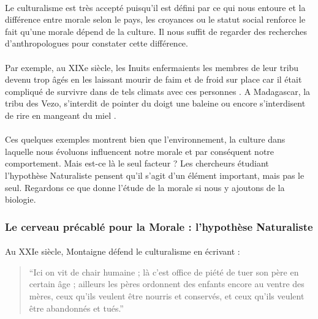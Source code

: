 \documentclass[10pt, french, a4paper]{report}
\begin{document}
\paragraph{}
Le culturalisme est très accepté puisqu'il est défini par ce qui nous entoure et la différence entre morale selon le pays, les croyances ou le statut social renforce le fait qu'une morale dépend de la culture. Il nous suffit de regarder des recherches d'anthropologues pour constater cette différence.

\paragraph{}
Par exemple, au XIXe siècle, les Inuits enfermaients les membres de leur tribu devenu trop âgés en les laissant mourir de faim et de froid sur place car il était compliqué de survivre dans de tels climats avec ces personnes \citep{redfield_primitive_1965}. A Madagascar, la tribu des Vezo, s'interdit de pointer du doigt une baleine ou encore s'interdisent de rire en mangeant du miel \citep{astuti_moralite_2007}.

\paragraph{}
Ces quelques exemples montrent bien que l'environnement, la culture dans laquelle nous évoluons influencent notre morale et par conséquent notre comportement. Mais est-ce là le seul facteur ? Les chercheurs étudiant l'hypothèse Naturaliste pensent qu'il s'agit d'un élément important, mais pas le seul. Regardons ce que donne l'étude de la morale si nous y ajoutons de la biologie.


\subsubsection{Le cerveau précablé pour la Morale : l'hypothèse Naturaliste}

\paragraph{}
Au XXIe siècle, Montaigne défend le culturalisme en écrivant : 

\begin{quotation}
  ``Ici on vit de chair humaine ; là c'est office de piété de tuer son père en certain âge ; ailleurs les pères ordonnent des enfants encore au ventre des mères, ceux qu'ils veulent être nourris et conservés, et ceux qu'ils veulent être abandonnés et tués.''
\end{quotation} 
\end{document}
